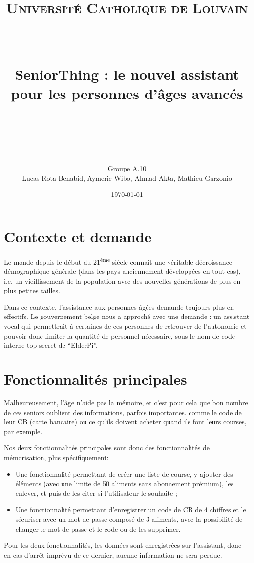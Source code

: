 \documentclass[11pt]{scrartcl} %
\title{	
	\normalfont\normalsize
	\textsc{Université Catholique de Louvain}\\ %
	\vspace{25pt} %
	\rule{\linewidth}{0.5pt}\\ %
	\vspace{20pt} %
	{\huge SeniorThing : le nouvel assistant pour les personnes d'âges avancés}\\ %
	\vspace{12pt} %
	\rule{\linewidth}{2pt}\\ %
	\vspace{12pt} %
}
\author{\LARGE Groupe A.10 \\[15pt] Lucas Rota-Benabid, Aymeric Wibo, Ahmad Akta, Mathieu Garzonio} %
\date{\normalsize\today} %
\begin{document}
\maketitle %

\section{Contexte et demande}

Le monde depuis le début du 21\textsuperscript{ème} siècle connait une véritable décroissance démographique générale (dans les pays anciennement développées en tout cas), i.e. un vieillissement de la population avec des nouvelles générations de plus en plus petites tailles.

Dans ce contexte, l'assistance aux personnes âgées demande toujours plus en effectifs. Le gouvernement belge nous a approché avec une demande : un assistant vocal qui permettrait à certaines de ces personnes de retrouver de l'autonomie et pouvoir donc limiter la quantité de personnel nécessaire, sous le nom de code interne top secret de ``ElderPi''.

\section{Fonctionnalités principales}

Malheureusement, l'âge n'aide pas la mémoire, et c'est pour cela que bon nombre de ces seniors oublient des informations, parfois importantes, comme le code de leur CB (carte bancaire) ou ce qu'ils doivent acheter quand ils font leurs courses, par exemple.

Nos deux fonctionnalités principales sont donc des fonctionnalités de mémorisation, plus spécifiquement:
\begin{itemize}
    \item Une fonctionnalité permettant de créer une liste de course, y ajouter des éléments (avec une limite de 50 aliments sans abonnement prémium), les enlever, et puis de les citer si l'utilisateur le souhaite ;
    \item Une fonctionnalité permettant d'enregistrer un code de CB de 4 chiffres et le sécuriser avec un mot de passe composé de 3 aliments, avec la possibilité de changer le mot de passe et le code ou de les supprimer.
\end{itemize}

Pour les deux fonctionnalités, les données sont enregistrées sur l'assistant, donc en cas d'arrêt imprévu de ce dernier, aucune information ne sera perdue.
\end{document}
